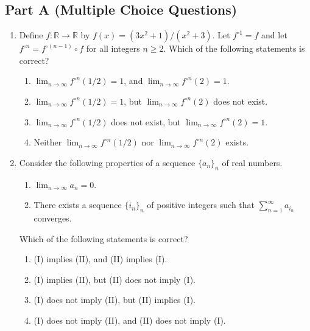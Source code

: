\documentclass[11pt, a4paper]{article}
\begin{document}
\subsection*{Part A (Multiple Choice Questions)}
\begin{enumerate}
  \item Define $f: \mathbb{R} \to \mathbb{R}$ by $f(x) = (3x^2 + 1)/(x^2 + 3)$. Let $f^{\circ 1} = f$ and let $f^{\circ n} = f^{\circ (n-1)} \circ f$ for all integers $n \ge 2$. Which of the following statements is correct?
  \begin{enumerate}[label=(\alph*)]
    \item $\lim_{n \to \infty} f^{\circ n}(1/2) = 1$, and $\lim_{n \to \infty} f^{\circ n}(2) = 1$.
    \item $\lim_{n \to \infty} f^{\circ n}(1/2) = 1$, but $\lim_{n \to \infty} f^{\circ n}(2)$ does not exist.
    \item $\lim_{n \to \infty} f^{\circ n}(1/2)$ does not exist, but $\lim_{n \to \infty} f^{\circ n}(2) = 1$.
    \item Neither $\lim_{n \to \infty} f^{\circ n}(1/2)$ nor $\lim_{n \to \infty} f^{\circ n}(2)$ exists.
  \end{enumerate}

  \item Consider the following properties of a sequence $\{a_n\}_n$ of real numbers.
  \begin{enumerate}[label=(\Roman*)]
    \item $\lim_{n \to \infty} a_n = 0$.
    \item There exists a sequence $\{i_n\}_n$ of positive integers such that $\sum_{n=1}^\infty a_{i_n}$ converges.
  \end{enumerate}
  Which of the following statements is correct?
  \begin{enumerate}[label=(\alph*)]
    \item (I) implies (II), and (II) implies (I).
    \item (I) implies (II), but (II) does not imply (I).
    \item (I) does not imply (II), but (II) implies (I).
    \item (I) does not imply (II), and (II) does not imply (I).
  \end{enumerate}


\end{enumerate}
\end{document}
